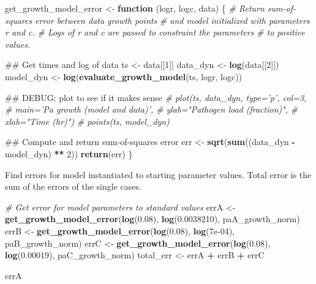 \documentclass[]{article}
\newenvironment{Shaded}{\begin{snugshade}}{\end{snugshade}}
\newcommand{\KeywordTok}[1]{\textcolor[rgb]{0.13,0.29,0.53}{\textbf{#1}}}
\newcommand{\DecValTok}[1]{\textcolor[rgb]{0.00,0.00,0.81}{#1}}
\newcommand{\FloatTok}[1]{\textcolor[rgb]{0.00,0.00,0.81}{#1}}
\newcommand{\StringTok}[1]{\textcolor[rgb]{0.31,0.60,0.02}{#1}}
\newcommand{\CommentTok}[1]{\textcolor[rgb]{0.56,0.35,0.01}{\textit{#1}}}
\newcommand{\ControlFlowTok}[1]{\textcolor[rgb]{0.13,0.29,0.53}{\textbf{#1}}}
\newcommand{\OperatorTok}[1]{\textcolor[rgb]{0.81,0.36,0.00}{\textbf{#1}}}
\newcommand{\NormalTok}[1]{#1}
\begin{document}
\begin{Shaded}
\begin{Highlighting}[]
\NormalTok{get_growth_model_error <-}\StringTok{ }\ControlFlowTok{function}\NormalTok{ (logr, logc, data) \{}
  \CommentTok{# Return sum-of-squares error between data growth points }
  \CommentTok{# and model initialized with parameters r and c.}
  \CommentTok{# Logs of r and c are passed to constraint the parameters}
  \CommentTok{# to positive values.}
  
\NormalTok{  ## Get times and log of data}
\NormalTok{  ts <-}\StringTok{ }\NormalTok{data[[}\DecValTok{1}\NormalTok{]]}
\NormalTok{  data_dyn <-}\StringTok{ }\KeywordTok{log}\NormalTok{(data[[}\DecValTok{2}\NormalTok{]])}
\NormalTok{  model_dyn <-}\StringTok{ }\KeywordTok{log}\NormalTok{(}\KeywordTok{evaluate_growth_model}\NormalTok{(ts, logr, logc))}
  
\NormalTok{  ## DEBUG: plot to see if it makes sense}
  \CommentTok{# plot(ts, data_dyn, type='p', col=3,}
  \CommentTok{#    main='Pa growth (model and data)',}
  \CommentTok{#    ylab="Pathogen load (fraction)",}
  \CommentTok{#    xlab="Time (hr)")}
  \CommentTok{# points(ts, model_dyn)}
  
\NormalTok{  ## Compute and return sum-of-squares error}
\NormalTok{  err <-}\StringTok{ }\KeywordTok{sqrt}\NormalTok{(}\KeywordTok{sum}\NormalTok{((data_dyn }\OperatorTok{-}\StringTok{ }\NormalTok{model_dyn) }\OperatorTok{**}\StringTok{ }\DecValTok{2}\NormalTok{))}
  \KeywordTok{return}\NormalTok{(err)}
\NormalTok{\}}
\end{Highlighting}
\end{Shaded}

Find errors for model instantiated to starting parameter values. Total
error is the sum of the errors of the single cases.

\begin{Shaded}
\begin{Highlighting}[]
\CommentTok{# Get error for model parameters to standard values}
\NormalTok{errA <-}\StringTok{ }\KeywordTok{get_growth_model_error}\NormalTok{(}\KeywordTok{log}\NormalTok{(}\FloatTok{0.08}\NormalTok{), }\KeywordTok{log}\NormalTok{(}\FloatTok{0.0038210}\NormalTok{), paA_growth_norm)}
\NormalTok{errB <-}\StringTok{ }\KeywordTok{get_growth_model_error}\NormalTok{(}\KeywordTok{log}\NormalTok{(}\FloatTok{0.08}\NormalTok{), }\KeywordTok{log}\NormalTok{(}\FloatTok{7e-04}\NormalTok{), paB_growth_norm)}
\NormalTok{errC <-}\StringTok{ }\KeywordTok{get_growth_model_error}\NormalTok{(}\KeywordTok{log}\NormalTok{(}\FloatTok{0.08}\NormalTok{), }\KeywordTok{log}\NormalTok{(}\FloatTok{0.00019}\NormalTok{), paC_growth_norm)}
\NormalTok{total_err <-}\StringTok{ }\NormalTok{errA }\OperatorTok{+}\StringTok{ }\NormalTok{errB }\OperatorTok{+}\StringTok{ }\NormalTok{errC}

\NormalTok{errA}
\end{Highlighting}
\end{Shaded}
\end{document}
